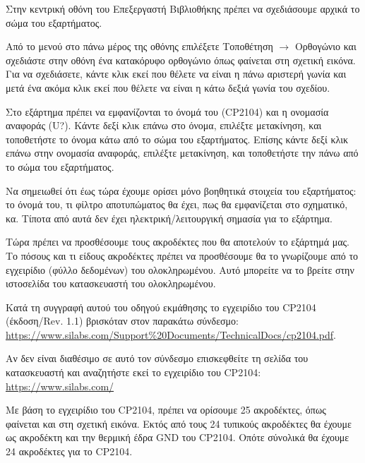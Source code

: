 \documentclass[a4paper]{article}
\begin{document}
Στην κεντρική οθόνη του Επεξεργαστή Βιβλιοθήκης πρέπει να σχεδιάσουμε αρχικά το σώμα του εξαρτήματος. 

Από το μενού στο πάνω μέρος της οθόνης επιλέξετε Τοποθέτηση $\rightarrow$ Ορθογώνιο και σχεδιάστε στην οθόνη ένα κατακόρυφο ορθογώνιο όπως φαίνεται στη σχετική εικόνα. Για να σχεδιάσετε, κάντε κλικ εκεί που θέλετε να είναι η πάνω αριστερή γωνία και μετά ένα ακόμα κλικ εκεί που θέλετε να είναι η κάτω δεξιά γωνία του σχεδίου.

Στο εξάρτημα πρέπει να εμφανίζονται το όνομά του (\textenglish{CP2104}) και η ονομασία αναφοράς (U?). Κάντε δεξί κλικ επάνω στο όνομα, επιλέξτε μετακίνηση, και τοποθετήστε το όνομα κάτω από το σώμα του εξαρτήματος. Επίσης κάντε δεξί κλικ επάνω στην ονομασία αναφοράς, επιλέξτε μετακίνηση, και τοποθετήστε την πάνω από το σώμα του εξαρτήματος. 

\begin{figure}
  \begin{center}
    \label{fig:kicad-main}
  \end{center}
\end{figure}

Να σημειωθεί ότι έως τώρα έχουμε ορίσει μόνο βοηθητικά στοιχεία του εξαρτήματος: το όνομά του, τι φίλτρο αποτυπώματος θα έχει, πως θα εμφανίζεται στο σχηματικό, κα. Τίποτα από αυτά δεν έχει ηλεκτρική/λειτουργική σημασία για το εξάρτημα.

Τώρα πρέπει να προσθέσουμε τους ακροδέκτες που θα αποτελούν το εξάρτημά μας. Το πόσους και τι είδους ακροδέκτες πρέπει να προσθέσουμε θα το γνωρίζουμε από το εγχειρίδιο (φύλλο δεδομένων) του ολοκληρωμένου. Αυτό μπορείτε να το βρείτε στην ιστοσελίδα του κατασκευαστή του ολοκληρωμένου. 

Κατά τη συγγραφή αυτού του οδηγού εκμάθησης το εγχειρίδιο του \textenglish{CP2104} (έκδοση/Rev. 1.1) βρισκόταν στον παρακάτω σύνδεσμο:\\
\href{https://www.silabs.com/Support\%20Documents/TechnicalDocs/cp2104.pdf}{https://www.silabs.com/Support\%20Documents/TechnicalDocs/cp2104.pdf}. 

Αν δεν είναι διαθέσιμο σε αυτό τον σύνδεσμο επισκεφθείτε τη σελίδα του κατασκευαστή και αναζητήστε εκεί το εγχειρίδιο του \textenglish{CP2104}: \\
\href{https://www.silabs.com/}{https://www.silabs.com/}

Με βάση το εγχειρίδιο του \textenglish{CP2104}, πρέπει να ορίσουμε 25 ακροδέκτες, όπως φαίνεται και στη σχετική εικόνα. Εκτός από τους 24 τυπικούς ακροδέκτες θα έχουμε ως ακροδέκτη και την θερμική έδρα GND του \textenglish{CP2104}. Οπότε σύνολικά θα έχουμε 24 ακροδέκτες για το \textenglish{CP2104}.
\end{document}
